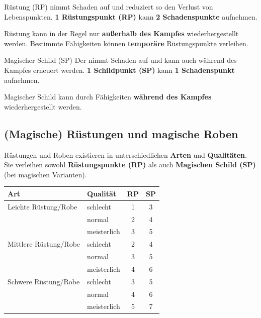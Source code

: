 \begin{rulebox}{Rüstung (RP)}
	 nimmt Schaden auf und reduziert so den Verlust von Lebenspunkten.  
	\textbf{1 Rüstungspunkt (RP)} kann \textbf{2 Schadenspunkte} aufnehmen.
	
	Rüstung kann in der Regel nur \textbf{außerhalb des Kampfes} wiederhergestellt werden.
	Bestimmte Fähigkeiten können \textbf{temporäre} Rüstungspunkte verleihen.
\end{rulebox}

\begin{rulebox}{Magischer Schild (SP)}
	Der  nimmt Schaden auf und kann auch während
	des Kampfes erneuert werden.  
	\textbf{1 Schildpunkt (SP)} kann \textbf{1 Schadenspunkt} aufnehmen.
	
	Magischer Schild kann durch Fähigkeiten \textbf{während des Kampfes} wiederhergestellt werden.
\end{rulebox}


\subsection*{(Magische) Rüstungen und magische Roben}

Rüstungen und Roben existieren in unterschiedlichen \textbf{Arten} und \textbf{Qualitäten}.
Sie verleihen sowohl \textbf{Rüstungspunkte (RP)} als auch \textbf{Magischen Schild (SP)} (bei magischen Varianten).

\medskip

\begin{center}
	\begin{tabular}{llcc}
		\toprule
		\textbf{Art} & \textbf{Qualität} & \textbf{RP} & \textbf{SP} \\
		\midrule
		Leichte Rüstung/Robe & schlecht     & 1 & 3 \\
		& normal       & 2 & 4 \\
		& meisterlich  & 3 & 5 \\
		\midrule
		Mittlere Rüstung/Robe & schlecht     & 2 & 4 \\
		& normal       & 3 & 5 \\
		& meisterlich  & 4 & 6 \\
		\midrule
		Schwere Rüstung/Robe & schlecht     & 3 & 5 \\
		& normal       & 4 & 6 \\
		& meisterlich  & 5 & 7 \\
		\bottomrule
	\end{tabular}
\end{center}

